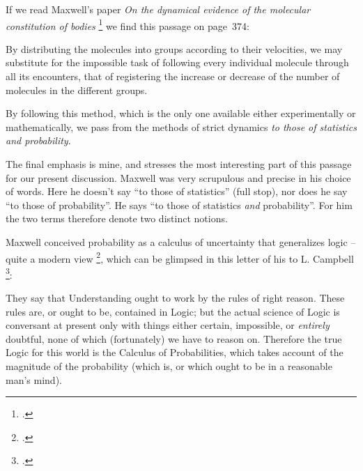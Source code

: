 \documentclass[\ifafour a4paper,12pt,\else a5paper,10pt,\fi%
onecolumn,oneside,article,%
british%
]{memoir}
\theoremstyle{remark}
\theoremstyle{innote}
\newcommand*{\citep}{\footcites}
\newcommand*{\citey}{\footcites}%
\renewcommand*{\|}[1][]{\nonscript\:#1\vert\nonscript\:\mathopen{}}
\renewcommand*{\=}{\TextOrMath\texteq\eq}
\newcommand*{\chap}{ch.}%
\newcommand*{\cf}{{cf.}}
\newenvironment{myquote}{\medskip\begin{adjustwidth}{\parindent}{\parindent}\small}{\end{adjustwidth}\medskip}
\begin{document}
If we read Maxwell's paper \emph{On the dynamical evidence of the
  molecular constitution of bodies} \citey{maxwell1875} we find this
passage on page~374:
\begin{myquote}
  By distributing the molecules into groups according to their velocities,
  we may substitute for the impossible task of following every individual
  molecule through all its encounters, that of registering the increase or
  decrease of the number of molecules in the different groups.

  By following this method, which is the only one available either
  experimentally or mathematically, we pass from the methods of strict
  dynamics \emph{to those of statistics and probability}.
\end{myquote}
The final emphasis is mine, and stresses the most interesting part of this
passage for our present discussion. Maxwell was very scrupulous and precise
in his choice of words. Here he doesn't say \enquote{to those of
  statistics} (full stop), nor does he say \enquote{to those of
  probability}. He says \enquote{to those of statistics \emph{and}
  probability}. For him the two terms therefore denote two distinct
notions.

Maxwell conceived probability as a calculus of uncertainty that generalizes
logic -- quite a modern view \citep[\cf][]{hailperin1996,hailperin2011},
which can be glimpsed in this letter of his to L. Campbell \citep%
[\chap~V, p.~143]{campbelletal1882}:
\begin{myquote}
  They say that Understanding ought to work by the rules of right reason.
  These rules are, or ought to be, contained in Logic; but the actual
  science of Logic is conversant at present only with things either
  certain, impossible, or \emph{entirely} doubtful, none of which
  (fortunately) we have to reason on. Therefore the true Logic for this
  world is the Calculus of Probabilities, which takes account of the
  magnitude of the probability (which is, or which ought to be in a
  reasonable man's mind).
\end{myquote}
\end{document}
